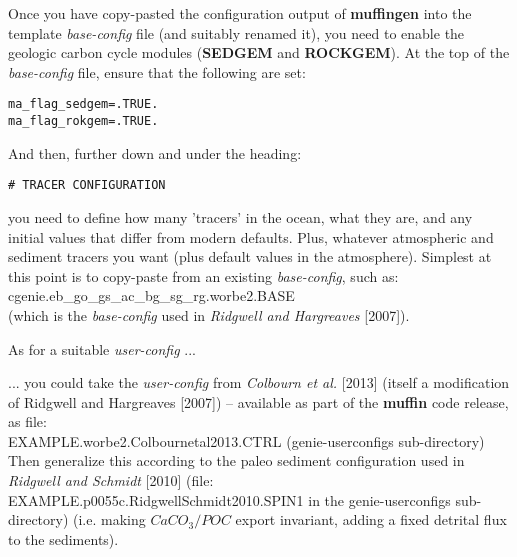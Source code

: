 Once you have copy-pasted the configuration output of \textbf{muffingen} into the template \textit{base-config} file (and suitably renamed it), you need to enable the geologic carbon cycle modules (\textbf{SEDGEM} and \textbf{ROCKGEM}). At the top of the \textit{base-config} file, ensure that the following are set:
\vspace{-1mm}\small\begin{verbatim}
ma_flag_sedgem=.TRUE.
ma_flag_rokgem=.TRUE.
\end{verbatim}\normalsize\vspace{-1mm}
And then, further down and under the heading:
\vspace{-1mm}\small\begin{verbatim}
# TRACER CONFIGURATION
\end{verbatim}\normalsize\vspace{-1mm}
you need to define how many 'tracers' in the ocean, what they are, and any initial values that differ from modern defaults. Plus, whatever atmospheric and sediment tracers you want (plus default values in the atmosphere). Simplest at this point is to copy-paste from an existing \textit{base-config}, such as:
\vspace{1mm}
\\\textsf{\footnotesize cgenie.eb\_go\_gs\_ac\_bg\_sg\_rg.worbe2.BASE}
\vspace{1mm}
\\(which is the \textit{base-config} used in \textit{Ridgwell and Hargreaves} [2007]).

\vspace{1mm}
As for a suitable \textit{user-config} ...

... you could take the \textit{user-config} from \textit{Colbourn et al.} [2013] (itself a modification of Ridgwell and Hargreaves [2007]) -- available as part of the \textbf{muffin} code release, as file:
\vspace{1mm}
\\\textsf{\footnotesize EXAMPLE.worbe2.Colbournetal2013.CTRL } (\textsf{\footnotesize genie-userconfigs } sub-directory)
\vspace{1mm}
\\Then generalize this according to the paleo sediment configuration used in \textit{Ridgwell and Schmidt} [2010] (file: \textsf{\footnotesize EXAMPLE.p0055c.RidgwellSchmidt2010.SPIN1 } in the \textsf{\footnotesize genie-userconfigs } sub-directory) (i.e. making \(CaCO_{3}/POC\) export invariant, adding a fixed detrital flux to the sediments).

